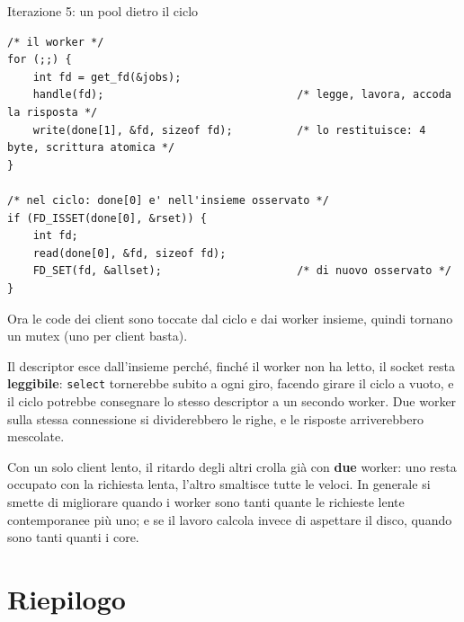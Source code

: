 \begin{esercizio}{Iterazione 5: un pool dietro il ciclo}
\begin{lstlisting}[language={[POSIX]C}, style=wnumbers, title={chatd.c: andata e ritorno di un descriptor}]
/* il worker */
for (;;) {
    int fd = get_fd(&jobs);
    handle(fd);                              /* legge, lavora, accoda la risposta */
    write(done[1], &fd, sizeof fd);          /* lo restituisce: 4 byte, scrittura atomica */
}

/* nel ciclo: done[0] e' nell'insieme osservato */
if (FD_ISSET(done[0], &rset)) {
    int fd;
    read(done[0], &fd, sizeof fd);
    FD_SET(fd, &allset);                     /* di nuovo osservato */
}
\end{lstlisting}

Ora le code dei client sono toccate dal ciclo e dai worker insieme, quindi tornano un mutex (uno per client basta).

Il descriptor esce dall'insieme perché, finché il worker non ha letto, il socket resta \textbf{leggibile}: \texttt{select}
tornerebbe subito a ogni giro, facendo girare il ciclo a vuoto, e il ciclo potrebbe consegnare lo stesso descriptor a un
secondo worker. Due worker sulla stessa connessione si dividerebbero le righe, e le risposte arriverebbero mescolate.

Con un solo client lento, il ritardo degli altri crolla già con \textbf{due} worker: uno resta occupato con la richiesta
lenta, l'altro smaltisce tutte le veloci. In generale si smette di migliorare quando i worker sono tanti quante le
richieste lente contemporanee più uno; e se il lavoro calcola invece di aspettare il disco, quando sono tanti quanti i
core.
\end{esercizio}

\section{Riepilogo}

